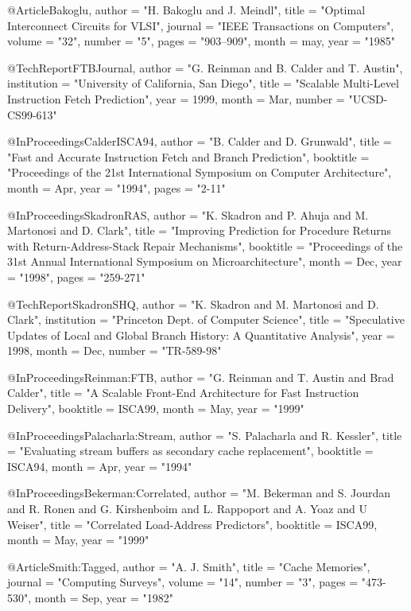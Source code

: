 @Article{Bakoglu,
  author =	"H. Bakoglu and J. Meindl",
  title =	"Optimal Interconnect Circuits for {VLSI}",
  journal =	"IEEE Transactions on Computers",
  volume =	"32",
  number =	"5",
  pages =	"903--909",
  month =	may,
  year =	"1985"
} 


@TechReport{FTBJournal,
  author =       "G. Reinman and B. Calder and T. Austin",
  institution =  "University of California, San Diego",
  title =        "Scalable Multi-Level Instruction Fetch Prediction",
  year =         1999,
  month =        Mar,
  number =       "UCSD-CS99-613"
}


@InProceedings{CalderISCA94,
  author =       "B. Calder and D. Grunwald",
  title =        "Fast and Accurate Instruction Fetch and Branch Prediction",
  booktitle =    "Proceedings of the 21st International Symposium on Computer Architecture",
  month =        Apr,
  year =         "1994",
  pages = "2-11"
}


@InProceedings{SkadronRAS,
  author =       "K. Skadron and P. Ahuja and M. Martonosi and D. Clark",
  title =        "Improving Prediction for Procedure Returns with Return-Address-Stack Repair Mechanisms",
  booktitle =    "Proceedings of the 31st Annual International Symposium on Microarchitecture",
  month =        Dec,
  year =         "1998",
  pages = "259-271"
}

@TechReport{SkadronSHQ,
  author =       "K. Skadron and M. Martonosi and D. Clark",
  institution =  "Princeton Dept. of Computer Science",
  title =        "Speculative Updates of Local and Global Branch History: A Quantitative Analysis",
  year =         1998,
  month =        Dec,
  number =       "TR-589-98"
}


@InProceedings{Reinman:FTB,
  author =	"G. Reinman and T. Austin and Brad Calder",
  title =	"A Scalable Front-End Architecture for Fast Instruction Delivery",
  booktitle =    ISCA99,
  month =        May,
  year =         "1999"
}


@InProceedings{Palacharla:Stream,
  author =	"S. Palacharla and R. Kessler",
  title =	"Evaluating stream buffers as secondary cache replacement",
  booktitle =    ISCA94,
  month =        Apr,
  year =         "1994"
}

@InProceedings{Bekerman:Correlated,
  author =	"M. Bekerman and S. Jourdan and R. Ronen and G. Kirshenboim and L. Rappoport and A. Yoaz and U Weiser",
  title =	"Correlated Load-Address Predictors",
  booktitle =    ISCA99,
  month =        May,
  year =         "1999"
}

@Article{Smith:Tagged,
  author =	"A. J. Smith",
  title =	"Cache Memories",
  journal =	"Computing Surveys",
  volume =	"14",
  number =	"3",
  pages =	"473-530",
  month =	Sep,
  year =	"1982"
} 


